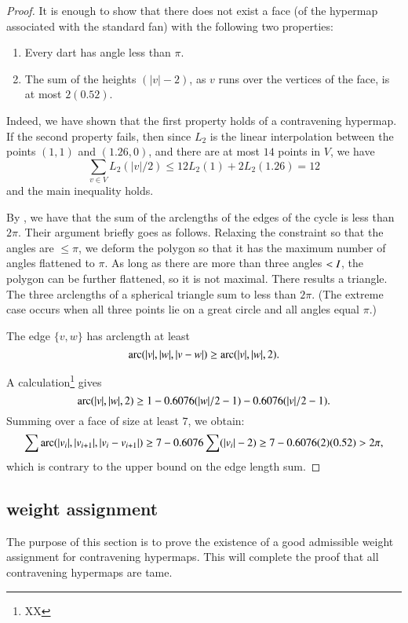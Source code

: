 \begin{proof} It is enough to show that there does not exist a face (of the hypermap associated with the standard fan)
with the following two properties:
\begin{enumerate}
\item Every dart has angle less than $\pi$.
\item The sum of the heights $(|v|-2)$, as $v$ runs
over the vertices of the face, is at most $2(0.52)$.
\end{enumerate}
Indeed, we have shown that the first property holds
of a contravening hypermap.  If the second property fails,
then since $L_2$ is the linear interpolation between
the points $(1,1)$ and $(1.26,0)$, and there are at most
$14$ points in $V$, we have
$$\sum_{v\in V}L_2(|v|/2) \le 12 L_2(1) + 2 L_2(1.26) =12$$
and the main inequality holds.

By \cite{vanderWaerden:1951}, we have that the sum of
the arclengths of the edges of the cycle is less than
$2\pi$.  Their argument briefly goes as follows. Relaxing the constraint so that the angles are $\le \pi$, we deform the polygon so that it has the maximum number of angles flattened to $\pi$.  As long as there are more than three angles $<I$, the polygon can be further flattened, so it is not maximal.  There results a triangle.  The three arclengths of a spherical triangle sum to less than $2\pi$.  (The extreme case occurs when all three points lie on a great circle and all angles equal $\pi$.)

The edge $\{v,w\}$ has arclength at least
$$
\operatorname{arc}(|v|,|w|,|v-w|) \ge \operatorname{arc}(|v|,|w|,2). 
$$

A calculation\footnote{XX} gives
$$
\operatorname{arc}(|v|,|w|,2)\ge 1 - 0.6076 (|w|/2 - 1) - 0.6076 (|v|/2 - 1).
$$
Summing over a face of size at least $7$, we obtain:
$$
\sum \operatorname{arc}(|v_i|,|v_{i+1}|,|v_i-v_{i+1}|)\ge
7 - 0.6076 \sum (|v_i|-2) \ge 7 - 0.6076 (2) (0.52) > 2\pi,
$$
which is contrary to the upper bound on the edge length
sum.
\end{proof}







\subsection{weight assignment}
    \label{sec:weight}

The purpose of this section is to prove the existence of a good
admissible weight assignment for contravening hypermaps.
This will complete the proof that all contravening
hypermaps are tame.

